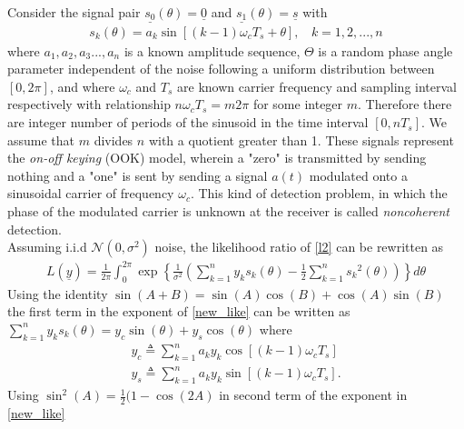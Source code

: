 \documentclass[12pt]{report}
\begin{document}
	Consider the signal pair $\underline{s_0}(\theta) = \underline{0}$ and $\underline{s_1}(\theta) = \underline{s}$ with
	\begin{equation}
	\label{non_coh1}
	\begin{aligned}
	s_k (\theta) = a_k \sin[(k - 1)\omega_c T_s + \theta] ,\ \ \ \ k = 1,2,...,n
	\end{aligned}
	\end{equation}
	where $a_1, a_2, a_3...,a_n$ is a known amplitude sequence, $\Theta$ is a random phase angle parameter independent of the noise following a uniform distribution between $[0, 2\pi]$, and
	where $\omega_c$ and $T_s$ are known carrier frequency and sampling interval respectively with relationship $n \omega_c T_s = m2\pi$ for some integer $m$. 
	Therefore there are integer number of periods of the sinusoid in the time interval $[0, nT_s]$. We assume that $m$ divides $n$ with a quotient greater than 1. 
	These signals represent the \textit{on-off keying} (OOK) model, wherein a "zero" is transmitted by sending nothing and a "one" is sent by sending a signal $a(t)$ modulated 
	onto a sinusoidal carrier of frequency $\omega_c$. This kind of detection problem, in which the phase of the modulated carrier is unknown at the receiver is called \textit{noncoherent} detection.
	\\
	Assuming i.i.d $\mathcal{N} (0,\sigma^2)$ noise, the likelihood ratio of \eqref{l2} can be rewritten as
	\begin{equation}
	\label{new_like}
	\begin{aligned}
	L(\underline{y}) = \frac{1}{2\pi} \int_0^{2\pi} \exp \left\{\frac{1}{\sigma^2} \left( \sum_{k=1} ^n y_k s_k(\theta) - \frac{1}{2} \sum_{k=1} ^n {s_k}^2 (\theta) \right) \right \} d\theta
	\end{aligned}
	\end{equation}
	Using the identity $\sin(A+B) = \sin(A)\cos(B) + \cos(A)\sin(B)$ the first term in the exponent of \eqref{new_like} can be written as $\sum_{k=1} ^n y_k s_k(\theta) = y_c \sin(\theta) + y_s \cos(\theta)$ where
	\begin{equation}
	\label{y_def}
	\begin{aligned}
	y_c \triangleq \sum_{k=1} ^n a_k y_k \cos[(k - 1)\omega_c T_s] \\
	y_s \triangleq \sum_{k=1} ^n a_k y_k \sin[(k - 1)\omega_c T_s].
	\end{aligned}
	\end{equation}		
	Using $\sin^2(A) = \frac{1}{2} (1 - \cos(2A)$ in second term of the exponent in \eqref{new_like}
\end{document}
